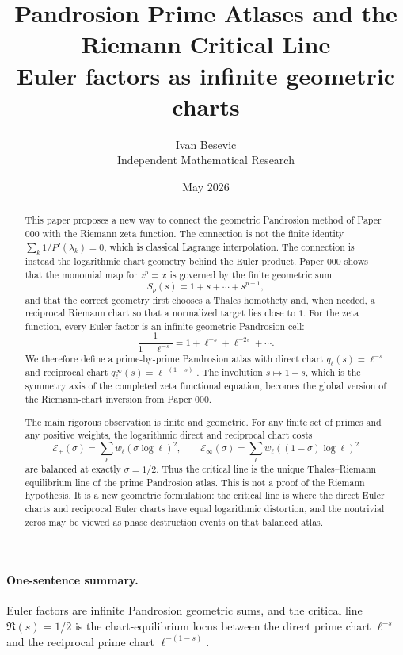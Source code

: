 \documentclass[11pt]{article}
\title{Pandrosion Prime Atlases and the Riemann Critical Line\\[3pt]
\large Euler factors as infinite geometric charts}
\author{Ivan Besevic\\Independent Mathematical Research}
\date{May 2026}
\newcommand{\E}{\mathcal E}
\begin{document}
\maketitle

\begin{abstract}
This paper proposes a new way to connect the geometric Pandrosion method of
Paper 000 with the Riemann zeta function.  The connection is not the finite
identity
\(\sum_k 1/P'(\lambda_k)=0\), which is classical Lagrange interpolation.  The
connection is instead the logarithmic chart geometry behind the Euler product.
Paper 000 shows that the monomial map for \(z^p=x\) is governed by the finite
geometric sum
\[
        S_p(s)=1+s+\cdots+s^{p-1},
\]
and that the correct geometry first chooses a Thales homothety and, when
needed, a reciprocal Riemann chart so that a normalized target lies close to
\(1\).  For the zeta function, every Euler factor is an infinite geometric
Pandrosion cell:
\[
        \frac{1}{1-\ell^{-s}}
        =1+\ell^{-s}+\ell^{-2s}+\cdots.
\]
We therefore define a prime-by-prime Pandrosion atlas with direct chart
\(q_\ell(s)=\ell^{-s}\) and reciprocal chart
\(q_\ell^\infty(s)=\ell^{-(1-s)}\).  The involution \(s\mapsto1-s\), which is
the symmetry axis of the completed zeta functional equation, becomes the
global version of the Riemann-chart inversion from Paper 000.

The main rigorous observation is finite and geometric.  For any finite set of
primes and any positive weights, the logarithmic direct and reciprocal chart
costs
\[
        \E_+(\sigma)=\sum_{\ell}w_\ell(\sigma\log\ell)^2,\qquad
        \E_\infty(\sigma)=\sum_{\ell}w_\ell((1-\sigma)\log\ell)^2
\]
are balanced at exactly \(\sigma=1/2\).  Thus the critical line is the unique
Thales--Riemann equilibrium line of the prime Pandrosion atlas.  This is not a
proof of the Riemann hypothesis.  It is a new geometric formulation: the
critical line is where the direct Euler charts and reciprocal Euler charts have
equal logarithmic distortion, and the nontrivial zeros may be viewed as phase
destruction events on that balanced atlas.
\end{abstract}

\paragraph{One-sentence summary.}
Euler factors are infinite Pandrosion geometric sums, and the critical line
\(\Re(s)=1/2\) is the chart-equilibrium locus between the direct prime chart
\(\ell^{-s}\) and the reciprocal prime chart \(\ell^{-(1-s)}\).
\end{document}
